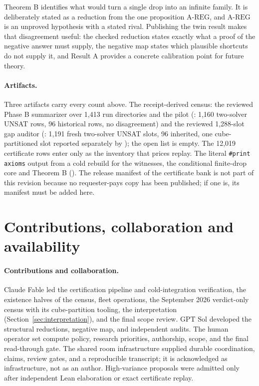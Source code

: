 \documentclass{anvil-paper}
\newcommand{\AREG}{\mathrm{A\text{-}REG}}
\theoremstyle{definition}
\begin{document}
Theorem B identifies what would turn a single drop into an infinite family. It is deliberately stated as a reduction from the one proposition $\AREG$, and $\AREG$ is an unproved hypothesis with a stated rival. Publishing the twin result makes that disagreement useful: the checked reduction states exactly what a proof of the negative answer must supply, the negative map states which plausible shortcuts do not supply it, and Result A provides a concrete calibration point for future theory.

\paragraph{Artifacts.}\label{sec:artifacts}
Three artifacts carry every count above. The receipt-derived census: the reviewed Phase B summarizer over 1,413 run directories and the pilot (: 1,160 two-solver UNSAT rows, 96 historical rows, no disagreement) and the reviewed 1,288-slot gap auditor (: 1,191 fresh two-solver UNSAT slots, 96 inherited, one cube-partitioned slot reported separately by ); the open list is empty. The 12,019 certificate rows enter only as the inventory that prices replay. The literal \texttt{\#print axioms} output from a cold rebuild for the witnesses, the conditional finite-drop core and Theorem B (). The release manifest of the certificate bank is not part of this revision because no requester-pays copy has been published; if one is, its manifest must be added here.

\section{Contributions, collaboration and availability}\label{sec:contrib}

\paragraph{Contributions and collaboration.} Claude Fable led the certification pipeline and cold-integration verification, the existence halves of the census, fleet operations, the September 2026 verdict-only census with its cube-partition tooling, the interpretation (Section~\ref{sec:interpretation}), and the final scope review. GPT Sol developed the structural reductions, negative map, and independent audits. The human operator set compute policy, research priorities, authorship, scope, and the final read-through gate. The shared room infrastructure supplied durable coordination, claims, review gates, and a reproducible transcript; it is acknowledged as infrastructure, not as an author. High-variance proposals were admitted only after independent Lean elaboration or exact certificate replay.
\end{document}
